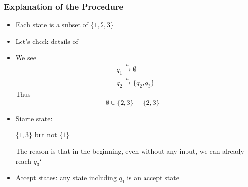 \begin{frame}[allowframebreaks]
  \frametitle{Explanation of the Procedure}
\begin{itemize}
\item Each state is a subset of $\{1,2,3\}$
\item Let's check details of

  \begin{center}
  \end{center}

\item We see
  \begin{equation*}
    \begin{split}
      & q_1 \xrightarrow{a} \emptyset\\
& q_2 \xrightarrow{a} \{q_2, q_3\}      
    \end{split}
  \end{equation*}
Thus
\begin{equation*}
  \emptyset \cup \{ 2, 3\} = \{2, 3\}
\end{equation*}
\item Starte state:
  \begin{center}
    $\{1, 3\}$ but not $\{1\}$
  \end{center}
  The reason is that in the beginning, even without any
  input, we can already reach $q_3$`
\item Accept states: any state including $q_1$ is an accept state
\end{itemize}
\end{frame}
